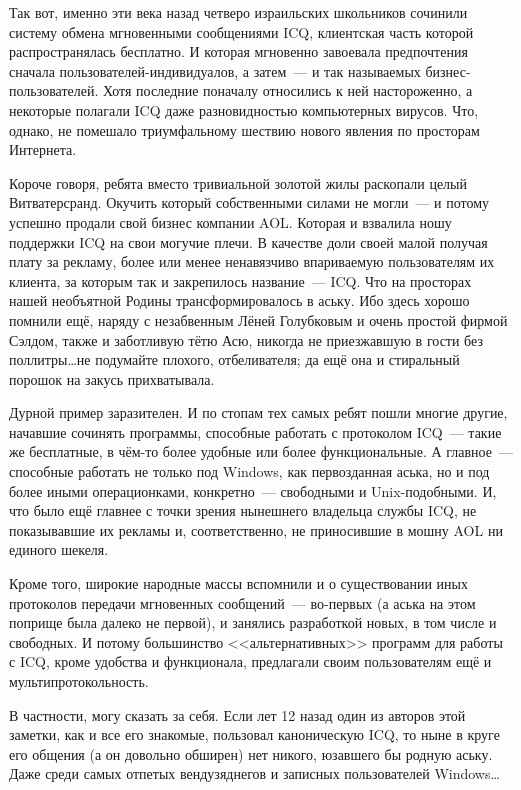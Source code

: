 Так вот, именно эти века назад четверо израильских школьников сочинили систему обмена мгновенными сообщениями ICQ, клиентская часть которой распространялась бесплатно. И которая мгновенно завоевала предпочтения сначала пользователей-индивидуалов, а затем~--- и так называемых бизнес-пользователей. Хотя последние поначалу относились к ней настороженно, а некоторые полагали ICQ даже разновидностью компьютерных вирусов. Что, однако, не помешало триумфальному шествию нового явления по просторам Интернета. 

Короче говоря, ребята вместо тривиальной золотой жилы раскопали целый Витватерсранд. Окучить который собственными силами не могли~--- и потому успешно продали свой бизнес компании AOL. Которая и взвалила ношу поддержки ICQ на свои могучие плечи. В качестве доли своей малой получая плату за рекламу, более или менее ненавязчиво впариваемую пользователям их клиента, за которым так и закрепилось название~--- ICQ. Что на просторах нашей необъятной Родины трансформировалось в аську. Ибо здесь хорошо помнили ещё, наряду с незабвенным Лёней Голубковым и очень простой фирмой Сэлдом, также и заботливую тётю Асю, никогда не приезжавшую в гости без поллитры\dots не подумайте плохого, отбеливателя; да ещё она и стиральный порошок на закусь прихватывала. 

Дурной пример заразителен. И по стопам тех самых ребят пошли многие другие, начавшие сочинять программы, способные работать с протоколом ICQ~--- такие же бесплатные, в чём-то более удобные или более функциональные. А главное~--- способные работать не только под Windows, как первозданная аська, но и под более иными операционками, конкретно~--- свободными и Unix-подобными. И, что было ещё главнее с точки зрения нынешнего владельца службы ICQ, не показывавшие их рекламы и, соответственно, не приносившие в мошну AOL ни единого шекеля. 

Кроме того, широкие народные массы вспомнили и о существовании иных протоколов передачи мгновенных сообщений~--- во-первых (а аська на этом поприще была далеко не первой), и занялись разработкой новых, в том числе и свободных. И потому большинство <<альтернативных>> программ для работы с ICQ, кроме удобства и функционала, предлагали своим пользователям ещё и мультипротокольность. 

В частности, могу сказать за себя. Если лет 12 назад один из авторов этой заметки, как и все его знакомые, пользовал каноническую ICQ, то ныне в круге его общения (а он довольно обширен) нет никого, юзавшего бы родную аську. Даже среди самых отпетых вендузяднегов и записных пользователей Windows\dots 

